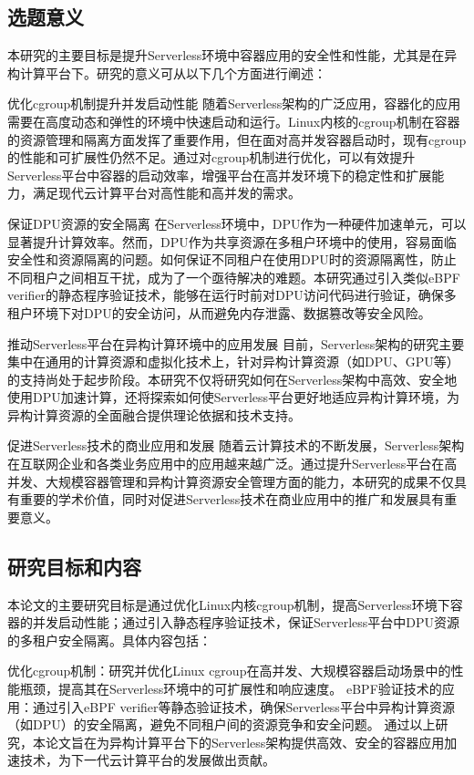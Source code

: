 \subsection{选题意义}
本研究的主要目标是提升Serverless环境中容器应用的安全性和性能，尤其是在异构计算平台下。研究的意义可从以下几个方面进行阐述：

优化cgroup机制提升并发启动性能
随着Serverless架构的广泛应用，容器化的应用需要在高度动态和弹性的环境中快速启动和运行。Linux内核的cgroup机制在容器的资源管理和隔离方面发挥了重要作用，但在面对高并发容器启动时，现有cgroup的性能和可扩展性仍然不足。通过对cgroup机制进行优化，可以有效提升Serverless平台中容器的启动效率，增强平台在高并发环境下的稳定性和扩展能力，满足现代云计算平台对高性能和高并发的需求。

保证DPU资源的安全隔离
在Serverless环境中，DPU作为一种硬件加速单元，可以显著提升计算效率。然而，DPU作为共享资源在多租户环境中的使用，容易面临安全性和资源隔离的问题。如何保证不同租户在使用DPU时的资源隔离性，防止不同租户之间相互干扰，成为了一个亟待解决的难题。本研究通过引入类似eBPF verifier的静态程序验证技术，能够在运行时前对DPU访问代码进行验证，确保多租户环境下对DPU的安全访问，从而避免内存泄露、数据篡改等安全风险。

推动Serverless平台在异构计算环境中的应用发展
目前，Serverless架构的研究主要集中在通用的计算资源和虚拟化技术上，针对异构计算资源（如DPU、GPU等）的支持尚处于起步阶段。本研究不仅将研究如何在Serverless架构中高效、安全地使用DPU加速计算，还将探索如何使Serverless平台更好地适应异构计算环境，为异构计算资源的全面融合提供理论依据和技术支持。

促进Serverless技术的商业应用和发展
随着云计算技术的不断发展，Serverless架构在互联网企业和各类业务应用中的应用越来越广泛。通过提升Serverless平台在高并发、大规模容器管理和异构计算资源安全管理方面的能力，本研究的成果不仅具有重要的学术价值，同时对促进Serverless技术在商业应用中的推广和发展具有重要意义。

\subsection{研究目标和内容}
本论文的主要研究目标是通过优化Linux内核cgroup机制，提高Serverless环境下容器的并发启动性能；通过引入静态程序验证技术，保证Serverless平台中DPU资源的多租户安全隔离。具体内容包括：

优化cgroup机制：研究并优化Linux cgroup在高并发、大规模容器启动场景中的性能瓶颈，提高其在Serverless环境中的可扩展性和响应速度。
eBPF验证技术的应用：通过引入eBPF verifier等静态验证技术，确保Serverless平台中异构计算资源（如DPU）的安全隔离，避免不同租户间的资源竞争和安全问题。
通过以上研究，本论文旨在为异构计算平台下的Serverless架构提供高效、安全的容器应用加速技术，为下一代云计算平台的发展做出贡献。

